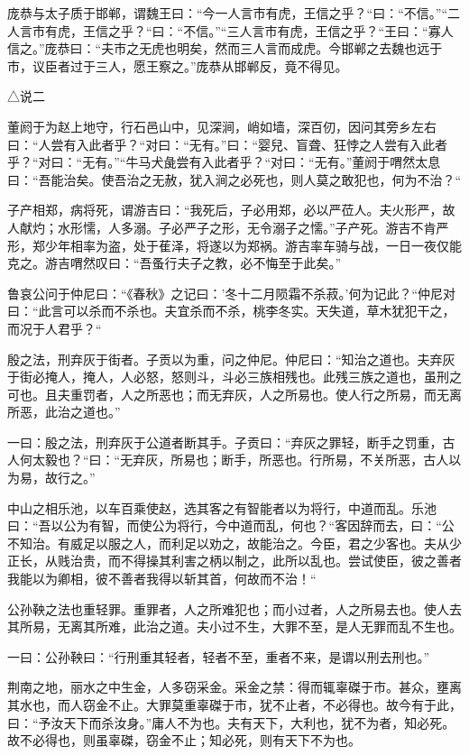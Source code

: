 \documentclass[]{article}
\begin{document}
庞恭与太子质于邯郸，谓魏王曰：``今一人言市有虎，王信之乎？``曰：``不信。''``二人言市有虎，王信之乎？``曰：``不信。''``三人言市有虎，王信之乎？``王曰：``寡人信之。''庞恭曰：``夫市之无虎也明矣，然而三人言而成虎。今邯郸之去魏也远于市，议臣者过于三人，愿王察之。''庞恭从邯郸反，竟不得见。

△说二

董阏于为赵上地守，行石邑山中，见深涧，峭如墙，深百仞，因问其旁乡左右曰：``人尝有入此者乎？``对曰：``无有。''曰：``婴兒、盲聋、狂悖之人尝有入此者乎？``对曰：``无有。''``牛马犬彘尝有入此者乎？``对曰：``无有。''董阏于喟然太息曰：``吾能治矣。使吾治之无赦，犹入涧之必死也，则人莫之敢犯也，何为不治？``

子产相郑，病将死，谓游吉曰：``我死后，子必用郑，必以严莅人。夫火形严，故人献灼；水形懦，人多溺。子必严子之形，无令溺子之懦。''子产死。游吉不肯严形，郑少年相率为盗，处于萑泽，将遂以为郑祸。游吉率车骑与战，一日一夜仅能克之。游吉喟然叹曰：``吾蚤行夫子之教，必不悔至于此矣。''

鲁哀公问于仲尼曰：``《春秋》之记曰：'冬十二月陨霜不杀菽。'何为记此？``仲尼对曰：``此言可以杀而不杀也。夫宜杀而不杀，桃李冬实。天失道，草木犹犯干之，而况于人君乎？``

殷之法，刑弃灰于街者。子贡以为重，问之仲尼。仲尼曰：``知治之道也。夫弃灰于街必掩人，掩人，人必怒，怒则斗，斗必三族相残也。此残三族之道也，虽刑之可也。且夫重罚者，人之所恶也；而无弃灰，人之所易也。使人行之所易，而无离所恶，此治之道也。''

一曰：殷之法，刑弃灰于公道者断其手。子贡曰：``弃灰之罪轻，断手之罚重，古人何太毅也？``曰：``无弃灰，所易也；断手，所恶也。行所易，不关所恶，古人以为易，故行之。''

中山之相乐池，以车百乘使赵，选其客之有智能者以为将行，中道而乱。乐池曰：``吾以公为有智，而使公为将行，今中道而乱，何也？``客因辞而去，曰：``公不知治。有威足以服之人，而利足以劝之，故能治之。今臣，君之少客也。夫从少正长，从贱治贵，而不得操其利害之柄以制之，此所以乱也。尝试使臣，彼之善者我能以为卿相，彼不善者我得以斩其首，何故而不治！``

公孙鞅之法也重轻罪。重罪者，人之所难犯也；而小过者，人之所易去也。使人去其所易，无离其所难，此治之道。夫小过不生，大罪不至，是人无罪而乱不生也。

一曰：公孙鞅曰：``行刑重其轻者，轻者不至，重者不来，是谓以刑去刑也。''

荆南之地，丽水之中生金，人多窃采金。采金之禁：得而辄辜磔于市。甚众，壅离其水也，而人窃金不止。大罪莫重辜磔于市，犹不止者，不必得也。故今有于此，曰：``予汝天下而杀汝身。''庸人不为也。夫有天下，大利也，犹不为者，知必死。故不必得也，则虽辜磔，窃金不止；知必死，则有天下不为也。
\end{document}
